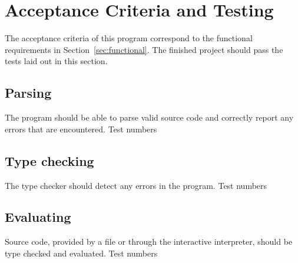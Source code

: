 \section{Acceptance Criteria and Testing}
The acceptance criteria of this program correspond to the functional
requirements in Section~\ref{sec:functional}. The finished project should pass
the tests laid out in this section.

\subsection{Parsing}
\Accept{\ref{sec:parser}} {The program should be able to parse valid source
code and correctly report any errors that are encountered.} {Test numbers}

\subsection{Type checking}
\Accept{\ref{sec:typecheck},~\ref{sec:owncheck},~\ref{sec:borrowcheck},~\ref{sec:kindcheck}}
{The type checker should detect any errors in the program.} {Test numbers}

\subsection{Evaluating}
\Accept{\ref{sec:evaluator},~\ref{sec:interpreter},~\ref{sec:load}} {Source
code, provided by a file or through the interactive interpreter, should be type
checked and evaluated.} {Test numbers}

